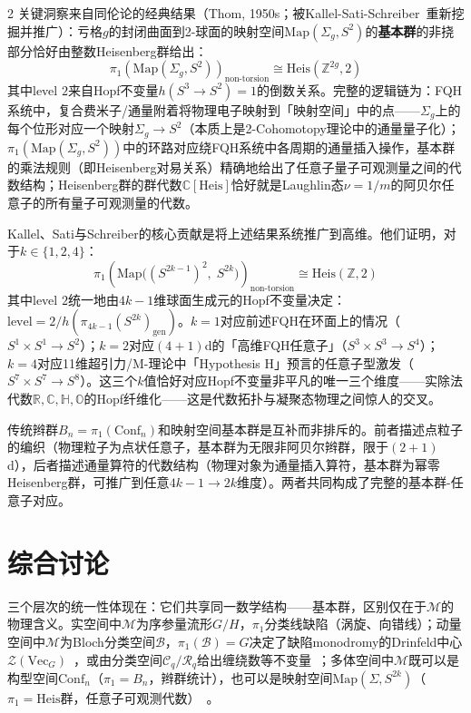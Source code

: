 \documentclass[a4paper,11pt]{ctexart}
\begin{document}
\begin{multicols}{2}
关键洞察来自同伦论的经典结果（Thom, 1950s；被Kallel-Sati-Schreiber~\cite{Kallel2026Anyons}重新挖掘并推广）：亏格$g$的封闭曲面到2-球面的映射空间$\mathrm{Map}(\Sigma_g,S^2)$的\textbf{基本群}的非挠部分恰好由整数Heisenberg群给出：
\begin{equation}
\pi_1\!\left(\mathrm{Map}(\Sigma_g,S^2)\right)_{\text{non-torsion}}\cong\mathrm{Heis}(\mathbb{Z}^{2g},2)
\end{equation}
其中level $2$来自Hopf不变量$h(S^3\to S^2)=1$的倒数关系。完整的逻辑链为：FQH系统中，复合费米子/通量附着将物理电子映射到「映射空间」中的点——$\Sigma_g$上的每个位形对应一个映射$\Sigma_g\to S^2$（本质上是2-Cohomotopy理论中的通量量子化）；$\pi_1(\mathrm{Map}(\Sigma_g,S^2))$中的环路对应绕FQH系统中各周期的通量插入操作，基本群的乘法规则（即Heisenberg对易关系）精确地给出了任意子量子可观测量之间的代数结构；Heisenberg群的群代数$\mathbb{C}[\mathrm{Heis}]$恰好就是Laughlin态$\nu=1/m$的阿贝尔任意子的所有量子可观测量的代数。

Kallel、Sati与Schreiber的核心贡献是将上述结果系统推广到高维。他们证明，对于$k\in\{1,2,4\}$：
\begin{equation}
\pi_1\!\left(\mathrm{Map}\big((S^{2k-1})^2,\;S^{2k}\big)\right)_{\text{non-torsion}}\cong\mathrm{Heis}(\mathbb{Z},2)
\end{equation}
其中level $2$统一地由$4k-1$维球面生成元的Hopf不变量决定：$\text{level}=2/h(\pi_{4k-1}(S^{2k})_{\text{gen}})$。$k=1$对应前述FQH在环面上的情况（$S^1\times S^1\to S^2$）；$k=2$对应$(4+1)$d的「高维FQH任意子」（$S^3\times S^3\to S^4$）；$k=4$对应11维超引力/M-理论中「Hypothesis H」预言的任意子型激发（$S^7\times S^7\to S^8$）。这三个$k$值恰好对应Hopf不变量非平凡的唯一三个维度——实除法代数$\mathbb{R},\mathbb{C},\mathbb{H},\mathbb{O}$的Hopf纤维化——这是代数拓扑与凝聚态物理之间惊人的交叉。

传统辫群$B_n=\pi_1(\mathrm{Conf}_n)$和映射空间基本群是互补而非排斥的。前者描述点粒子的编织（物理粒子为点状任意子，基本群为无限非阿贝尔辫群，限于$(2+1)$d），后者描述通量算符的代数结构（物理对象为通量插入算符，基本群为幂零Heisenberg群，可推广到任意$4k-1\to2k$维度）。两者共同构成了完整的基本群-任意子对应。

\section{综合讨论}

三个层次的统一性体现在：它们共享同一数学结构——基本群，区别仅在于$\mathcal{M}$的物理含义。实空间中$\mathcal{M}$为序参量流形$G/H$，$\pi_1$分类线缺陷（涡旋、向错线）；动量空间中$\mathcal{M}$为Bloch分类空间$\mathcal{B}$，$\pi_1(\mathcal{B})=G$决定了缺陷monodromy的Drinfeld中心$\mathcal{Z}(\mathrm{Vec}_G)$~\cite{Sati2026Drinfeld}，或由分类空间$\mathcal{C}_q/\mathcal{R}_q$给出缠绕数等不变量~\cite{Kitaev2009,Ryu2010}；多体空间中$\mathcal{M}$既可以是构型空间$\mathrm{Conf}_n$（$\pi_1=B_n$，辫群统计），也可以是映射空间$\mathrm{Map}(\Sigma,S^{2k})$（$\pi_1=\mathrm{Heis}$群，任意子可观测代数）~\cite{Kallel2026Anyons}。


\end{multicols}
\end{document}
